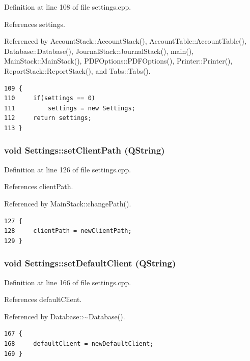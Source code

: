 Definition at line 108 of file settings.cpp.

References settings.

Referenced by Account\-Stack::Account\-Stack(), Account\-Table::Account\-Table(), Database::Database(), Journal\-Stack::Journal\-Stack(), main(), Main\-Stack::Main\-Stack(), PDFOptions::PDFOptions(), Printer::Printer(), Report\-Stack::Report\-Stack(), and Tabs::Tabs().

\footnotesize\begin{verbatim}109 {
110     if(settings == 0)
111         settings = new Settings;
112     return settings;
113 }
\end{verbatim}\normalsize 


\hypertarget{classSettings_a2}{
\subsubsection[setClientPath]{\setlength{\rightskip}{0pt plus 5cm}void Settings::set\-Client\-Path (QString)}}
\label{classSettings_a2}


Definition at line 126 of file settings.cpp.

References client\-Path.

Referenced by Main\-Stack::change\-Path().

\footnotesize\begin{verbatim}127 {
128     clientPath = newClientPath;
129 }
\end{verbatim}\normalsize 


\hypertarget{classSettings_a10}{
\subsubsection[setDefaultClient]{\setlength{\rightskip}{0pt plus 5cm}void Settings::set\-Default\-Client (QString)}}
\label{classSettings_a10}


Definition at line 166 of file settings.cpp.

References default\-Client.

Referenced by Database::$\sim$Database().

\footnotesize\begin{verbatim}167 {
168     defaultClient = newDefaultClient;
169 }
\end{verbatim}\normalsize 


